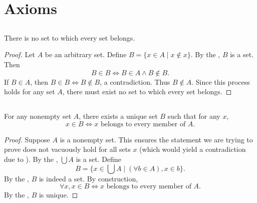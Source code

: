 \documentclass{report}
\begin{document}
\section{Axioms}%
\label{sec:axioms}

\subsection{}%
\label{sub:theorem-2a}

\begin{theorem}[2A]

  There is no set to which every set belongs.


\end{theorem}

\begin{proof}

  Let $A$ be an arbitrary set.
  Define $B = \{ x \in A \mid x \not\in x \}$.
  By the , $B$ is a set.
  Then $$B \in B \iff B \in A \land B \not\in B.$$
  If $B \in A$, then $B \in B \iff B \not\in B$, a contradiction.
  Thus $B \not\in A$.
  Since this process holds for any set $A$, there must exist no set to which
    every set belongs.

\end{proof}

\subsection{}%
\label{sub:theorem-2b}

\begin{theorem}[2B]

  For any nonempty set $A$, there exists a unique set $B$ such that for any
    $x$, $$x \in B \iff x \text{ belongs to every member of } A.$$

\end{theorem}

\begin{proof}

  Suppose $A$ is a nonempty set.
  This ensures the statement we are trying to prove does not vacuously hold for
    all sets $x$ (which would yield a contradiction due to
    ).
  By the , $\bigcup A$ is a set.
  Define $$B = \{ x \in \bigcup A \mid (\forall b \in A), x \in b \}.$$
  By the , $B$ is indeed a set.
  By construction,
    $$\forall x, x \in B \iff x \text{ belongs to every member of } A.$$
  By the , $B$ is unique.

\end{proof}
\end{document}
